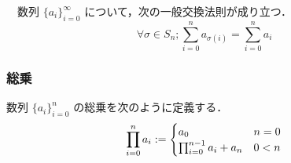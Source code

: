 \documentclass[autodetect-engine,dvipdfmx-if-dvi,ja=standard,a4paper,12pt]{bxjsbook}
\begin{document}
					\begin{thm}[交換法則]　数列 $\{a_i\}_{i=0}^{\infty}$ について，次の一般交換法則が成り立つ．
						\begin{equation}
							\forall \sigma \in S_n ; \sum_{i=0}^{n} a_{\sigma(i)}  = \sum_{i=0}^{n} a_i
						\end{equation} 
					\end{thm}
				\subsubsection{総乗}
					\begin{dfn} 数列 $\{a_i\}_{i=0}^{n}$ の総乗を次のように定義する．
						\begin{equation}
							\prod_{i=0}^{n} a_i := \begin{cases}
								a_0 & n = 0 \\
								\prod_{i=0}^{n-1} a_i + a_{n} &  0 < n
							\end{cases}
						\end{equation}
					\end{dfn}	
\end{document}
